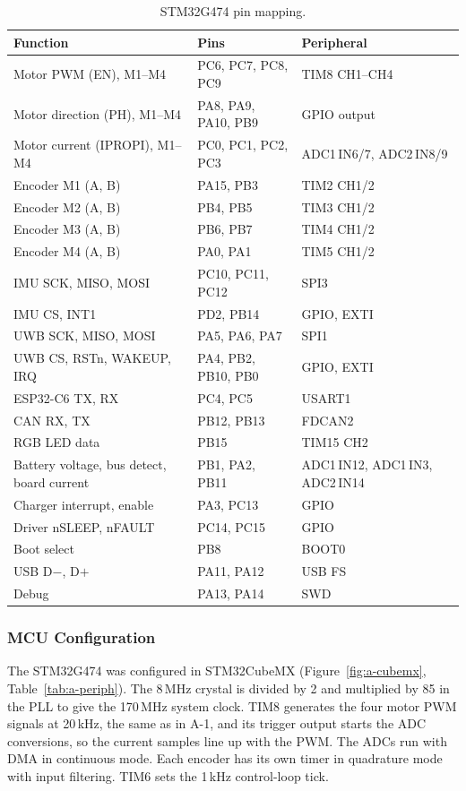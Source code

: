 \documentclass[12pt,a4paper]{article}
\begin{document}
\begin{table}[H]
\centering\small
\caption{STM32G474 pin mapping.}
\label{tab:a-pinmap}
\begin{tabular}{@{}L{0.25\textwidth} L{0.37\textwidth} L{0.28\textwidth}@{}}
\toprule
\textbf{Function} & \textbf{Pins} & \textbf{Peripheral} \\
\midrule
Motor PWM (EN), M1--M4 & PC6, PC7, PC8, PC9 & TIM8 CH1--CH4 \\
Motor direction (PH), M1--M4 & PA8, PA9, PA10, PB9 & GPIO output \\
Motor current (IPROPI), M1--M4 & PC0, PC1, PC2, PC3 & ADC1\,IN6/7, ADC2\,IN8/9 \\
Encoder M1 (A, B) & PA15, PB3 & TIM2 CH1/2 \\
Encoder M2 (A, B) & PB4, PB5 & TIM3 CH1/2 \\
Encoder M3 (A, B) & PB6, PB7 & TIM4 CH1/2 \\
Encoder M4 (A, B) & PA0, PA1 & TIM5 CH1/2 \\
IMU SCK, MISO, MOSI & PC10, PC11, PC12 & SPI3 \\
IMU CS, INT1 & PD2, PB14 & GPIO, EXTI \\
UWB SCK, MISO, MOSI & PA5, PA6, PA7 & SPI1 \\
UWB CS, RSTn, WAKEUP, IRQ & PA4, PB2, PB10, PB0 & GPIO, EXTI \\
ESP32-C6 TX, RX & PC4, PC5 & USART1 \\
CAN RX, TX & PB12, PB13 & FDCAN2 \\
RGB LED data & PB15 & TIM15 CH2 \\
Battery voltage, bus detect, board current & PB1, PA2, PB11 & ADC1\,IN12, ADC1\,IN3, ADC2\,IN14 \\
Charger interrupt, enable & PA3, PC13 & GPIO \\
Driver nSLEEP, nFAULT & PC14, PC15 & GPIO \\
Boot select & PB8 & BOOT0 \\
USB D$-$, D$+$ & PA11, PA12 & USB FS \\
Debug & PA13, PA14 & SWD \\
\bottomrule
\end{tabular}
\end{table}


\subsubsection{MCU Configuration}

The STM32G474 was configured in STM32CubeMX (Figure~\ref{fig:a-cubemx},
Table~\ref{tab:a-periph}). The 8\,MHz crystal is divided by 2 and multiplied by
85 in the PLL to give the 170\,MHz system clock. TIM8 generates the four motor
PWM signals at 20\,kHz, the same as in A-1, and its trigger output starts the
ADC conversions, so the current samples line up with the PWM. The ADCs run
with DMA in continuous mode. Each encoder has its own timer in quadrature mode
with input filtering. TIM6 sets the 1\,kHz control-loop tick.
\end{document}
